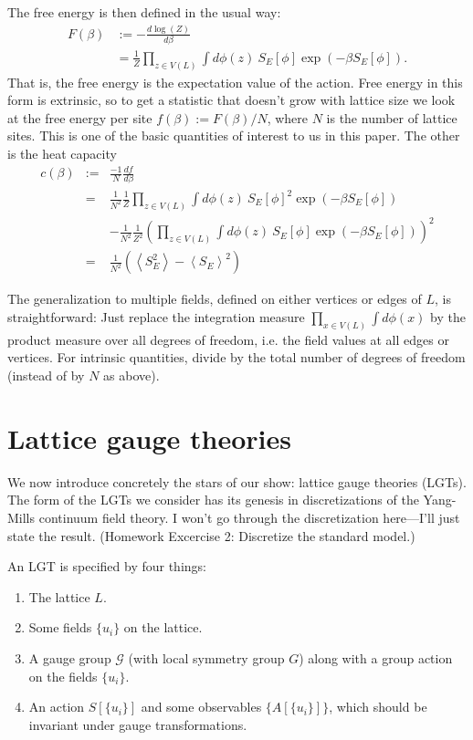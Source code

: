 \documentclass[9pt,twocolumn,twoside]{article}
\begin{document}
The free energy is then defined in the usual way:
\begin{align*}
F(\beta)& := -\frac{d \log(Z)}{d\beta}\\
& = \frac{1}{Z}  \prod_{z\in V(L)}\int d\phi(z) \: S_E[\phi] \exp(-\beta S_E[\phi]).
\end{align*}
That is, the free energy is the expectation value of the action.  Free energy in this form is extrinsic, so to get a statistic that doesn't grow with lattice size we look at the free energy per site $f(\beta):=F(\beta)/N$, where $N$ is the number of lattice sites.  This is one of the basic quantities of interest to us in this paper.  The other is the heat capacity 
\begin{eqnarray*}
c(\beta)& := & \frac{-1}{N}\frac{df}{d\beta}\\
& = & \frac{1}{N^2}\frac{1}{Z}  \prod_{z\in V(L)}\int d\phi(z) \: S_E[\phi]^2 \exp(-\beta S_E[\phi]) \\
& & -\frac{1}{N^2}\frac{1}{Z^2} \left( \prod_{z\in V(L)}\int d\phi(z) \: S_E[\phi] \exp(-\beta S_E[\phi])\right)^2 \\
& = & \frac{1}{N^2}\left(\left<S_E^2\right> - \left<S_E\right>^2\right)
\end{eqnarray*}

The generalization to multiple fields, defined on either vertices or edges of $L$, is straightforward: Just replace the integration measure $\prod_{x \in V(L)} \int d\phi(x)$ by the product measure over all degrees of freedom, i.e. the field values at all edges or vertices.  For intrinsic quantities, divide by the total number of degrees of freedom (instead of by $N$ as above).

\section{Lattice gauge theories}
We now introduce concretely the stars of our show: lattice gauge theories (LGTs).  The form of the LGTs we consider has its genesis in discretizations of the Yang-Mills continuum field theory.  I won't go through the discretization here---I'll just state the result.  (Homework Excercise 2: Discretize the standard model.)

An LGT is specified by four things:
\begin{enumerate}
\item The lattice $L$.
\item Some fields $\{u_i\}$ on the lattice.
\item A gauge group $\mathcal{G}$ (with local symmetry group $G$) along with a group action on the fields $\{u_i\}$.
\item An action $S[\{u_i\}]$ and some observables $\{A[\{u_i\}]\}$, which should be invariant under gauge transformations.
\end{enumerate}
\end{document}
